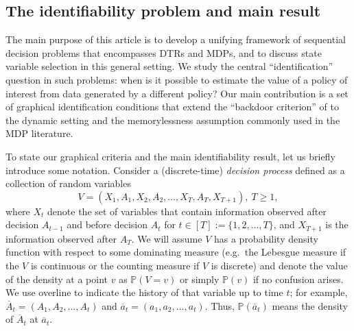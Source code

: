 \documentclass[12pt,a4paper]{article}
\theoremstyle{definition}
\newcommand{\PP}[0]{\mathbb{P}}
\begin{document}
\subsection{The identifiability problem and main result}
The main purpose of this article is to develop a unifying framework of
sequential decision problems that encompasses DTRs and MDPs, and to
discuss state variable selection in this general setting. We study the
central ``identification'' question in such problems: when is it possible
to estimate the value of a policy of interest from data generated by a
different policy? Our main contribution is a set of graphical
identification conditions that extend the ``backdoor criterion'' of
\textcite{pearl1993} to the dynamic setting and the memorylessness
assumption commonly used in the MDP literature.


To state our graphical criteria and the main identifiability
result, let us briefly introduce some notation. Consider a
(discrete-time) \emph{decision process} defined as a collection of
random variables
\[
  V = (X_1, A_1, X_2, A_2, \dots, X_T, A_T, X_{T+1}),~T \geq 1,
\]
where $X_t$ denote the set of variables that contain information
observed after decision $A_{t-1}$ and before decision $A_t$ for $t \in
[T] := \{1, 2, \dots,T\}$, and
$X_{T+1}$ is the information observed after $A_T$. We will assume $V$
has a probability density function with respect to some dominating
measure (e.g.\ the Lebesgue measure if the $V$ is continuous or the
counting measure if $V$ is discrete) and denote the value of the density at a point $v$ as $\PP(V =
v)$ or simply $\PP(v)$ if no confusion arises. We use overline to
indicate the history of that variable up to time $t$; for
example, $\overline{A}_t = (A_1, A_2, \dots, A_t)$ and $\overline{a}_t =
(a_1,a_2,\dots, a_t)$. Thus, $\PP(\overline{a}_t)$ means the density of
$\overline{A}_t$ at $\overline{a}_t$.
\end{document}
